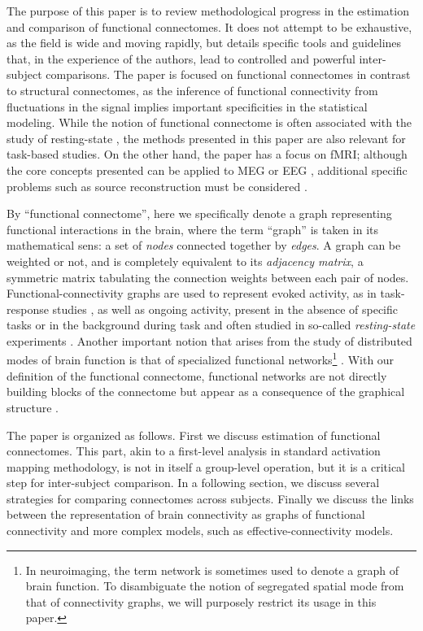 \documentclass[5p]{elsarticle}
\begin{document}
The purpose of this paper is to review methodological progress in the
estimation and comparison of functional connectomes. It does not attempt
to be exhaustive, as the field is wide and moving rapidly, but details
specific tools and guidelines that, in the experience of the authors,
lead to controlled and powerful inter-subject comparisons. The paper is
focused on functional connectomes in contrast to structural connectomes,
as the inference of functional connectivity from fluctuations in the
signal implies important specificities in the statistical modeling. While 
the notion of functional
connectome is often associated with the study of resting-state
\cite{biswal2010}, the methods presented in this paper are also relevant
for task-based studies. On the other hand, the paper has a focus on fMRI;
although the core concepts presented can be applied to MEG or EEG
\cite{stam2004}, additional specific problems such as source
reconstruction must be considered \cite{schoffelen2009}.

By ``functional connectome'', here we specifically denote a graph
representing functional interactions in the brain, where the term
``graph'' is taken in its mathematical sens: a set of \emph{nodes}
connected together by \emph{edges}. A graph can be weighted or not, and
is completely equivalent to its \emph{adjacency matrix}, a symmetric
matrix tabulating the connection weights between each pair of nodes.
Functional-connectivity graphs are used to represent evoked activity,
as in task-response studies \cite{mcintosh2000}, as well as
ongoing activity, present in the absence of specific tasks or in 
the background during task and often studied in so-called \emph{resting-state}
experiments \cite{raichle2010}. Another important notion that arises from
the study of distributed modes of brain function is that of specialized
functional networks\footnote{In neuroimaging, the term network is
sometimes used to denote a graph of brain function. To disambiguate the
notion of segregated spatial mode \cite{fox2005} from that of
connectivity graphs, we will purposely restrict its usage in this
paper.} \cite{fox2005}. With our definition of the functional connectome, functional
networks are not directly building blocks of the connectome but appear
as a consequence of the graphical structure
\cite{varoquaux2010c,varoquaux2012}.

The paper is organized as follows. First we discuss estimation of
functional connectomes. This part, akin to a first-level analysis in
standard activation mapping methodology, is not in itself a group-level
operation, but it is a critical step for inter-subject comparison.
In a following section, we discuss several strategies for comparing
connectomes across subjects. Finally we discuss the links between the
representation of brain connectivity as graphs of functional connectivity
and more complex models, such as effective-connectivity models.
\end{document}
